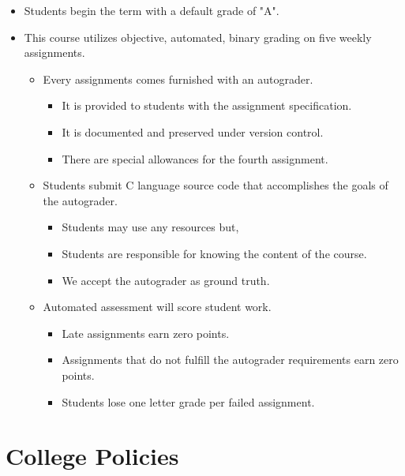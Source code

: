 \documentclass[11pt]{article}
\begin{document}
\begin{itemize}
    \item Students begin the term with a default grade of "A".
    \item This course utilizes objective, automated, binary grading on five weekly assignments.
        \begin{itemize}
            \item  Every assignments comes furnished with an autograder.
            \begin{itemize}
                \item  It is provided to students with the assignment specification.
                \item  It is documented and preserved under version control.
                \item There are special allowances for the fourth assignment.
            \end{itemize}
            \item  Students submit C language source code that accomplishes the goals of the autograder.
            \begin{itemize}
                \item  Students may use any resources but,
                \item  Students are responsible for knowing the content of the course.
                \item  We accept the autograder as ground truth.
            \end{itemize}
            \item  Automated assessment will score student work.
            \begin{itemize}
                \item  Late assignments earn zero points.
                \item  Assignments that do not fulfill the autograder requirements earn zero points.
                \item  Students lose one letter grade per failed assignment.
            \end{itemize}
        \end{itemize}
\end{itemize}


\section*{College Policies}
\end{document}
